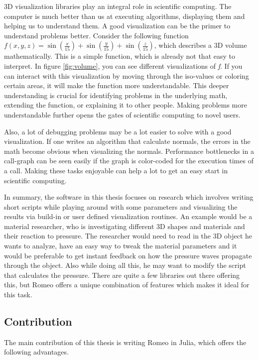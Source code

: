 3D visualization libraries play an integral role in scientific computing.
The computer is much better than us at executing algorithms, displaying them and helping us to understand them.
A good visualization can be the primer to understand problems better.
Consider the following function $f(x,y,z)=\sin(\frac{x}{15})+\sin(\frac{y}{15})+\sin(\frac{z}{15})$, which describes a 3D volume mathematically. 
This is a simple function, which is already not that easy to interpret. In figure \ref{fig:volume}, you can see different visualizations of \textit{f}.
If you can interact with this visualization by moving through the iso-values or coloring certain areas, it will make the function more understandable.
This deeper understanding is crucial for identifying problems in the underlying math, extending the function, or explaining it to other people. 
Making problems more understandable further opens the gates of scientific computing to novel users.

Also, a lot of debugging problems may be a lot easier to solve with a good visualization. 
If one writes an algorithm that calculate normals, the errors in the math become obvious when visualizing the normals.
Performance bottlenecks in a call-graph can be seen easily if the graph is color-coded for the execution times of a call. 
Making these tasks enjoyable can help a lot to get an easy start in scientific computing.

In summary, the software in this thesis focuses on research which involves writing short scripts while playing around with some parameters and visualizing the results via build-in or user defined visualization routines.
An example would be a material researcher, who is investigating different 3D shapes and materials and their reaction to pressure.
The researcher would need to read in the 3D object he wants to analyze, have an easy way to tweak the material parameters and it would be preferable to get instant feedback on how the pressure waves propagate through the object. Also while doing all this, he may want to modify the script that calculates the pressure.
There are quite a few libraries out there offering this, but Romeo offers a unique combination of features which makes it ideal for this task.

\subsection{Contribution}

The main contribution of this thesis is writing Romeo in Julia, which offers the following advantages.

